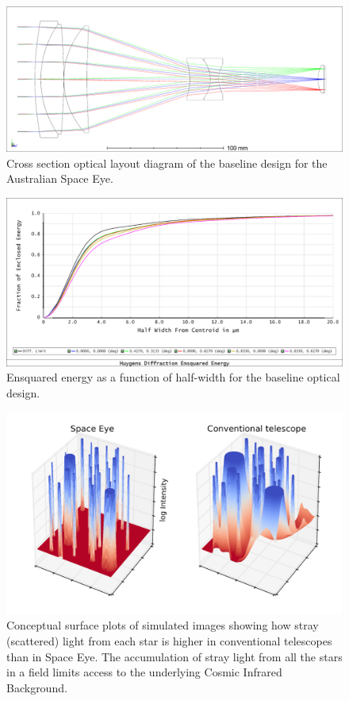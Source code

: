 \documentclass[]{iac}
\begin{document}
\begin{figure}[tp]
  \center \includegraphics[width=\columnwidth]{figures/spie-layout.png}
  \caption{\label{fig:optics}Cross section optical layout diagram of the baseline design for the Australian Space Eye.}
\end{figure}

\begin{figure}[tp]
  \center \includegraphics[width=\columnwidth]{figures/ensquared.png}
  \caption{\label{fig:ensquared}Ensquared energy as a function of half-width for the baseline optical design.}
\end{figure}

\begin{figure}[tp]
  \includegraphics[width=\columnwidth]{figures/wings.png}
  \caption{\label{fig:wings}Conceptual surface plots of simulated images showing how stray (scattered) light from each star is
    higher in conventional telescopes than in Space Eye. The accumulation of stray light from all the stars in a field
    limits access to the underlying Cosmic Infrared Background.}
\end{figure}
\end{document}

